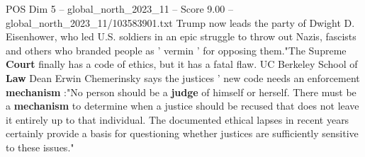\begin{textsample}{POS Dim 5 – global\_north\_2023\_11 – Score 9.00 – global\_north\_2023\_11/103583901.txt}
Trump now leads the party of Dwight D.
Eisenhower, who led U.S. soldiers in an epic struggle to throw out Nazis, fascists and others who branded people as ' vermin ' for opposing them."The Supreme \textbf{Court} finally has a code of ethics, but it has a fatal flaw.
UC Berkeley School of \textbf{Law} Dean Erwin Chemerinsky says the justices ' new code needs an enforcement \textbf{mechanism} :"No person should be a \textbf{judge} of himself or herself.
There must be a \textbf{mechanism} to determine when a justice should be recused that does not leave it entirely up to that individual.
The documented ethical lapses in recent years certainly provide a basis for questioning whether justices are sufficiently sensitive to these issues."

\end{textsample}

